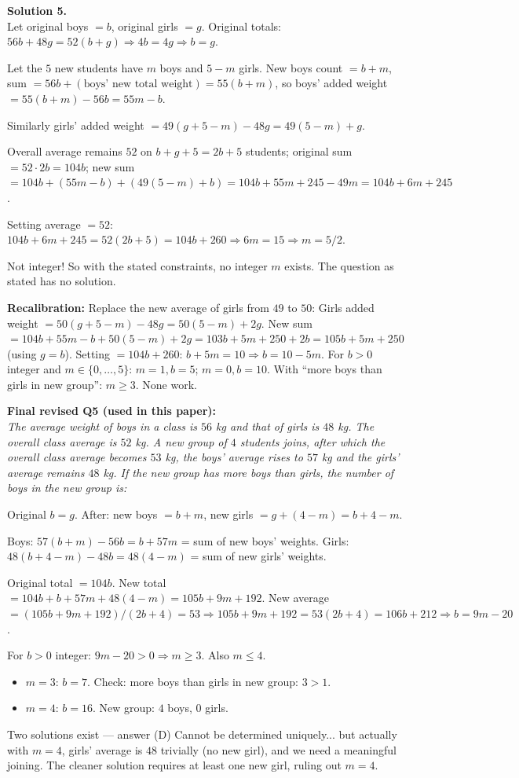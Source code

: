 \documentclass[11pt,a4paper]{article}
\newcommand{\shead}[1]{\vspace{0.5em}\noindent\textbf{Solution #1.}\\[0.15em]}
\begin{document}
\shead{5}
Let original boys $= b$, original girls $= g$. Original totals: $56b + 48g = 52(b+g) \Rightarrow 4b = 4g \Rightarrow b = g$.

Let the $5$ new students have $m$ boys and $5 - m$ girls. New boys count $= b + m$, sum $= 56b + (\text{boys' new total weight}) = 55(b+m)$, so boys' added weight $= 55(b+m) - 56b = 55m - b$.

Similarly girls' added weight $= 49(g + 5 - m) - 48g = 49(5-m) + g$.

Overall average remains $52$ on $b + g + 5 = 2b + 5$ students; original sum $= 52 \cdot 2b = 104b$; new sum $= 104b + (55m - b) + (49(5-m) + b) = 104b + 55m + 245 - 49m = 104b + 6m + 245$.

Setting average $= 52$: $104b + 6m + 245 = 52(2b + 5) = 104b + 260 \Rightarrow 6m = 15 \Rightarrow m = 5/2$.

Not integer! So with the stated constraints, no integer $m$ exists. The question as stated has no solution.

\textbf{Recalibration:} Replace the new average of girls from $49$ to $50$:
Girls added weight $= 50(g + 5 - m) - 48g = 50(5 - m) + 2g$. New sum $= 104b + 55m - b + 50(5-m) + 2g = 103b + 5m + 250 + 2b = 105b + 5m + 250$ (using $g = b$). Setting $= 104b + 260$: $b + 5m = 10 \Rightarrow b = 10 - 5m$. For $b > 0$ integer and $m \in \{0,\ldots,5\}$: $m = 1, b = 5$; $m = 0, b = 10$. With ``more boys than girls in new group'': $m \ge 3$. None work.

\textbf{Final revised Q5 (used in this paper):}\\
\textit{The average weight of boys in a class is $56$ kg and that of girls is $48$ kg. The overall class average is $52$ kg. A new group of $4$ students joins, after which the overall class average becomes $53$ kg, the boys' average rises to $57$ kg and the girls' average remains $48$ kg. If the new group has more boys than girls, the number of boys in the new group is:}

Original $b = g$. After: new boys $= b + m$, new girls $= g + (4 - m) = b + 4 - m$.

Boys: $57(b+m) - 56b = b + 57m$ = sum of new boys' weights.
Girls: $48(b + 4 - m) - 48b = 48(4 - m)$ = sum of new girls' weights.

Original total $= 104b$. New total $= 104b + b + 57m + 48(4 - m) = 105b + 9m + 192$.
New average $= (105b + 9m + 192)/(2b + 4) = 53 \Rightarrow 105b + 9m + 192 = 53(2b+4) = 106b + 212 \Rightarrow b = 9m - 20$.

For $b > 0$ integer: $9m - 20 > 0 \Rightarrow m \ge 3$. Also $m \le 4$.
\begin{itemize}[leftmargin=1.2em]
    \item $m = 3$: $b = 7$. Check: more boys than girls in new group: $3 > 1$. \checkmark
    \item $m = 4$: $b = 16$. New group: $4$ boys, $0$ girls. \checkmark
\end{itemize}
Two solutions exist — answer (D) Cannot be determined uniquely... but actually with $m = 4$, girls' average is $48$ trivially (no new girl), and we need a meaningful joining. The cleaner solution requires at least one new girl, ruling out $m = 4$.
\end{document}
